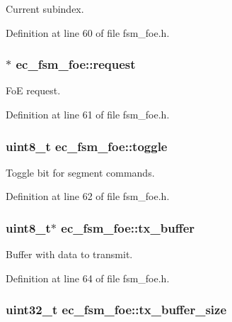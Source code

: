 Current subindex. 



Definition at line 60 of file fsm\-\_\-foe.\-h.

\subsubsection[{request}]{$\ast$ ec\-\_\-fsm\-\_\-foe\-::request}\label{structec__fsm__foe_a000c08fd63b07a083d61a781b68529ee}


Fo\-E request. 



Definition at line 61 of file fsm\-\_\-foe.\-h.

\subsubsection[{toggle}]{\setlength{\rightskip}{0pt plus 5cm}uint8\-\_\-t ec\-\_\-fsm\-\_\-foe\-::toggle}\label{structec__fsm__foe_ae3c3f1d7a1a8637434f33e1de9fb0c01}


Toggle bit for segment commands. 



Definition at line 62 of file fsm\-\_\-foe.\-h.

\subsubsection[{tx\-\_\-buffer}]{\setlength{\rightskip}{0pt plus 5cm}uint8\-\_\-t$\ast$ ec\-\_\-fsm\-\_\-foe\-::tx\-\_\-buffer}\label{structec__fsm__foe_afe4370bcebc74b342e51dc6ec7c167bd}


Buffer with data to transmit. 



Definition at line 64 of file fsm\-\_\-foe.\-h.

\subsubsection[{tx\-\_\-buffer\-\_\-size}]{\setlength{\rightskip}{0pt plus 5cm}uint32\-\_\-t ec\-\_\-fsm\-\_\-foe\-::tx\-\_\-buffer\-\_\-size}\label{structec__fsm__foe_a25f7057a98c25d28cb089b7268cb415d}


